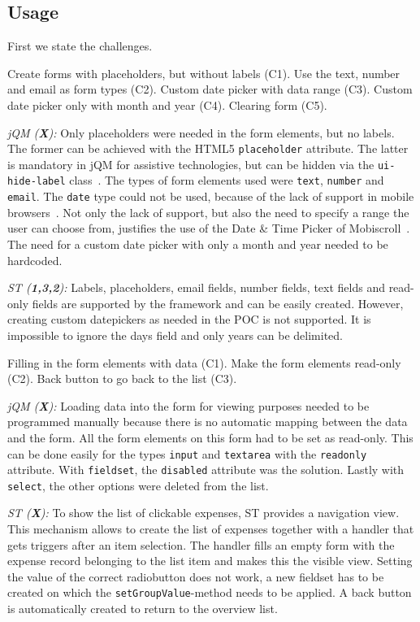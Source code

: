 \documentclass[a4paper]{artikel3}
\newcommand{\code}[1]{\texttt{#1}}
\renewcommand{\paragraph}[1]{\vspace{2mm} \noindent {\bf #1}  }
\newcommand{\framework}[2]{ \emph{#1 (\textbf{#2}): }} %
\newcommand{\challenge}[1]{\paragraph{#1}}
\begin{document}
\subsection{Usage} %
\label{sec:poc}
First we state the challenges.

\challenge{Forms (C1,C2,C3,C4,C5)}
Create forms with placeholders, but without labels (C1).
Use the text, number and email as form types (C2).
Custom date picker with data range (C3).
Custom date picker only with month and year (C4).
Clearing form (C5).

\framework{jQM}{X}
Only placeholders were needed in the form elements, but no labels.
The former can be achieved with the HTML5 \code{placeholder} attribute.
The latter is mandatory in jQM for assistive technologies, but can be hidden via the \code{ui-hide-label} class~\cite{JQuery2013}. 
The types of form elements used were \code{text}, \code{number} and \code{email}.
The \code{date} type could not be used, because of the lack of support in mobile browsers~\cite{Deveria2013b}.
Not only the lack of support, but also the need to specify a range the user can choose from, justifies the use of the Date \& Time Picker of Mobiscroll~\cite{Mobiscroll2013}.
The need for a custom date picker with only a month and year needed to be hardcoded.

\framework{ST}{1,3,2}
Labels,  placeholders,  email fields, number fields, text fields and read-only fields are supported by the framework and can be easily created.  However, creating custom datepickers as needed in the POC is not supported.  It is impossible to ignore the days field and only years can be delimited.  

\challenge{Form filling (C1,C2,C3)}
Filling in the form elements with data (C1).
Make the form elements read-only (C2).
Back button to go back to the list (C3).

\framework{jQM}{X}
Loading data into the form for viewing purposes needed to be programmed manually because there is no automatic mapping between the data and the form.
All the form elements on this form had to be set as read-only.
This can be done easily for the types \code{input} and \code{textarea} with the \code{readonly} attribute.
With \code{fieldset}, the \code{disabled} attribute was the solution.
Lastly with \code{select}, the other options were deleted from the list.

\framework{ST}{X}
To show the list of clickable expenses,  ST provides a navigation view.  This mechanism allows to create the list of expenses together with a handler that gets triggers after an item selection.  The handler fills an empty form with the expense record belonging to the list item and makes this the visible view.  Setting the value of the correct radiobutton does not work,  a new fieldset has to be created on which the \code{setGroupValue}-method needs to be applied.  A back button is automatically created to return to the overview list.
\end{document}

